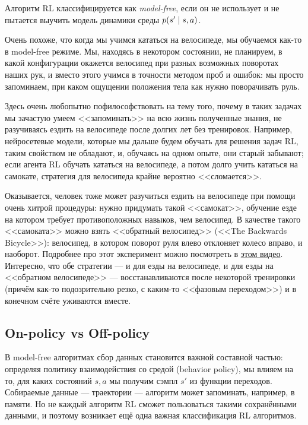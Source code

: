 \begin{definition}
Алгоритм RL классифицируется как \emph{model-free}, если он не использует и не пытается выучить модель динамики среды $p(s' \HM\mid s, a)$. 
\end{definition}

\begin{example}
Очень похоже, что когда мы учимся кататься на велосипеде, мы обучаемся как-то в model-free режиме. Мы, находясь в некотором состоянии, не планируем, в какой конфигурации окажется велосипед при разных возможных поворотах наших рук, и вместо этого учимся в точности методом проб и ошибок: мы просто запоминаем, при каком ощущении положения тела как нужно поворачивать руль. 

Здесь очень любопытно пофилософствовать на тему того, почему в таких задачах мы зачастую умеем <<запоминать>> на всю жизнь полученные знания, не разучиваясь ездить на велосипеде после долгих лет без тренировок. Например, нейросетевые модели, которые мы дальше будем обучать для решения задач RL, таким свойством не обладают, и, обучаясь на одном опыте, они старый забывают; если агента RL обучать кататься на велосипеде, а потом долго учить кататься на самокате, стратегия для велосипеда крайне вероятно <<сломается>>.

Оказывается, человек тоже может разучиться ездить на велосипеде при помощи очень хитрой процедуры: нужно придумать такой <<самокат>>, обучение езде на котором требует противоположных навыков, чем велосипед. В качестве такого <<самоката>> можно взять <<обратный велосипед>> (<<The Backwards Bicycle>>): велосипед, в котором поворот руля влево отклоняет колесо вправо, и наоборот. Подробнее про этот эксперимент можно посмотреть в \href{https://www.youtube.com/watch?v=MFzDaBzBlL0}{этом видео}. Интересно, что обе стратегии --- и для езды на велосипеде, и для езды на <<обратном велосипеде>> --- восстанавливаются после некоторой тренировки (причём как-то подозрительно резко, с каким-то <<фазовым переходом>>) и в конечном счёте уживаются вместе.
\end{example}

\subsection{On-policy vs Off-policy}

В model-free алгоритмах сбор данных становится важной составной частью: определяя политику взаимодействия со средой (behavior policy), мы влияем на то, для каких состояний $s, a$ мы получим сэмпл $s'$ из функции переходов. Собираемые данные --- траектории --- алгоритм может запоминать, например, в памяти. Но не каждый алгоритм RL сможет пользоваться такими сохранёнными данными, и поэтому возникает ещё одна важная классификация RL алгоритмов.

